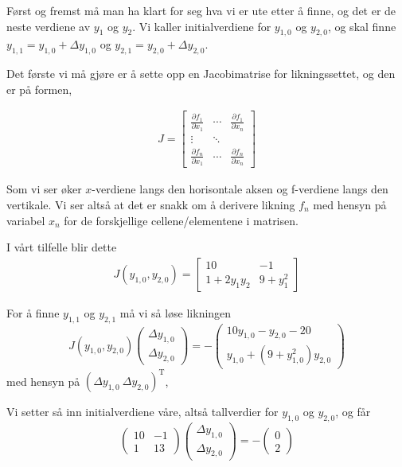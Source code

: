 \documentclass[norsk, a4paper, 12pt, titlepage]{article}
\begin{document}
Først og fremst må man ha klart for seg hva vi er ute etter å finne,
og det er de neste verdiene av $y_{1}$ og $y_{2}$.  Vi kaller
initialverdiene for $y_{1,0}$ og $y_{2,0}$, og skal finne $y_{1,1} =
y_{1,0} + \Delta y_{1,0}$ og $y_{2,1} = y_{2,0} + \Delta y_{2,0}$.

Det første vi må gjøre er å sette opp en Jacobimatrise for
likningssettet, og den er på formen,

\begin{eqnarray*}
J = \left[
\begin{array}{ccc}
\frac{\partial f_{1}}{\partial x_{1}} & \cdots & \frac{\partial
  f_{1}}{\partial x_{n}} \\
\vdots & \ddots & \\
\frac{\partial f_{n}}{\partial x_{1}} & \cdots & \frac{\partial
  f_{n}}{\partial x_{n}}
\end{array}
\right]
\end{eqnarray*}

Som vi ser øker $x$-verdiene langs den horisontale aksen og f-verdiene
langs den vertikale.  Vi ser altså at det er snakk om å derivere
likning $f_{n}$ med hensyn på variabel $x_{n}$ for de forskjellige
cellene/elementene i matrisen.

I vårt tilfelle blir dette
\begin{eqnarray*}
J(y_{1,0}, y_{2,0}) = \left[
\begin{array}{cc}
10 & -1 \\
1 + 2y_{1}y_{2} & 9 + y_{1}^{2}
\end{array}
\right]
\end{eqnarray*}

For å finne $y_{1,1}$ og $y_{2,1}$ må vi så løse likningen
\begin{equation*}
J(y_{1,0}, y_{2,0})
\left(
\begin{array}{cc}
\Delta y_{1,0}\\
\Delta y_{2,0}
\end{array}
\right)
= - \left(
\begin{array}{cc}
10y_{1,0} - y_{2,0} -20 \\
y_{1,0} + (9 + y_{1,0}^{2})y_{2,0}
\end{array}
\right)
\end{equation*}
med hensyn på $(\Delta y_{1,0}\ \Delta y_{2,0})^{\text{T}}$,

Vi setter så inn initialverdiene våre, altså tallverdier for $y_{1,0}$
og $y_{2,0}$, og får
\begin{equation*}
\left(
\begin{array}{cc}
10 & -1 \\
1  & 13
\end{array}
\right)
\left(
\begin{array}{cc}
\Delta y_{1,0}\\
\Delta y_{2,0}
\end{array}
\right)
= -
\left(
\begin{array}{cc}
0\\
2
\end{array}
\right)
\end{equation*}
\end{document}
